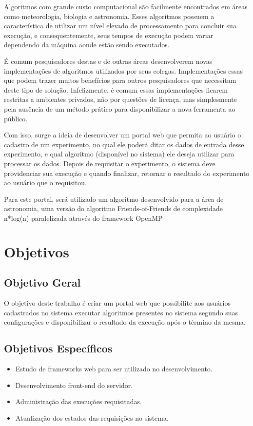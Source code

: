 \documentclass[12pt]{article}
\begin{document}
Algoritmos com grande custo computacional são facilmente encontrados em áreas como meteorologia, biologia e astronomia. Esses algoritmos possuem a característica de utilizar um nível elevado de processamento para concluir sua execução, e consequentemente, seus tempos de execução podem variar dependendo da máquina aonde estão sendo executados.

É comum pesquisadores destas e de outras áreas desenvolverem novas implementações de algoritmos utilizados por seus colegas. Implementações essas que podem trazer muitos benefícios para outros pesquisadores que necessitam deste tipo de solução. Infelizmente, é comum essas implementações ficarem restritas a ambientes privados, não por questões de licença, mas simplesmente pela ausência de um método prático para disponibilizar a nova ferramenta ao público.

Com isso, surge a ideia de desenvolver um portal web que permita ao usuário o cadastro de um experimento, no qual ele poderá ditar os dados de entrada desse experimento, e qual algoritmo (disponível no sistema) ele deseja utilizar para processar os dados. Depois de requisitar o experimento, o sistema deve providenciar sua execução e quando finalizar, retornar o resultado do experimento ao usuário que o requisitou.

Para este portal, será utilizado um algoritmo desenvolvido para a área de astronomia, uma versão do algoritmo Friends-of-Friends de complexidade n*log(n) paralelizada através do framework OpenMP

\section{Objetivos}
\subsection{Objetivo Geral}
O objetivo deste trabalho é criar um portal web que possibilite aos usuários cadastrados no sistema  executar algoritmos presentes no sistema segundo suas configurações e disponibilizar o resultado da execução após o término da mesma.

\subsection{Objetivos Específicos}
\begin{itemize}
	\item Estudo de frameworks web para ser utilizado no desenvolvimento.
	\item Desenvolvimento front-end do servidor.
	\item Administração das execuções requisitadas.
	\item Atualização dos estados das requisições no sistema.
    
\end{itemize}
\end{document}
